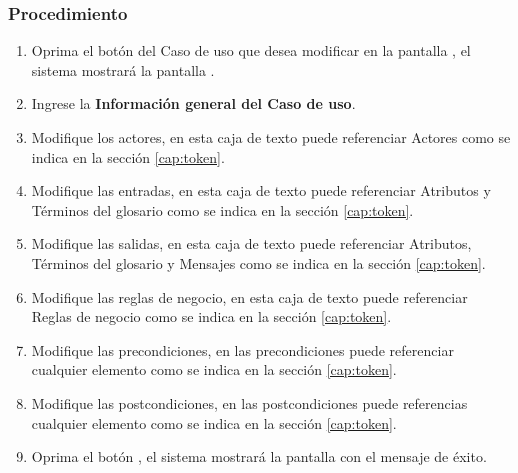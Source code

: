 \subsubsection{Procedimiento}
\begin{enumerate}
	\item Oprima el botón \btnEditar del Caso de uso que desea modificar en la pantalla , el sistema mostrará la pantalla . 

	
	\item Ingrese la \textbf{Información general del Caso de uso}.
	
	\item Modifique los actores, en esta caja de texto puede referenciar Actores como se indica en la sección \ref{cap:token}.
	
	\item Modifique las entradas, en esta caja de texto puede referenciar Atributos y Términos del glosario como se indica en la sección \ref{cap:token}.
	
	\item Modifique las salidas, en esta caja de texto puede referenciar Atributos, Términos del glosario y Mensajes como se indica en la sección \ref{cap:token}.
	
	\item Modifique las reglas de negocio, en esta caja de texto puede referenciar Reglas de negocio como se indica en la sección \ref{cap:token}.
	
	\item Modifique las precondiciones, en las precondiciones puede referenciar cualquier elemento como se indica en la sección \ref{cap:token}.
	
	\item Modifique las postcondiciones, en las postcondiciones puede referencias cualquier elemento como se indica en la sección \ref{cap:token}.
	
	\item Oprima el botón , el sistema mostrará la pantalla  con el mensaje de éxito.
\end{enumerate}
